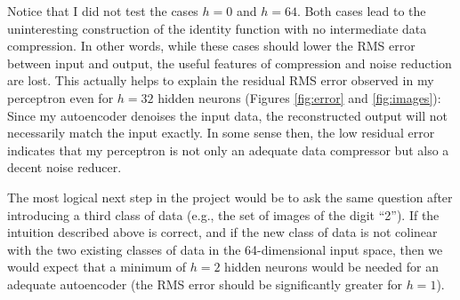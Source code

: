 \documentclass[12pt]{article}
\begin{document}
Notice that I did not test the cases $h=0$ and $h=64$. Both cases lead to the uninteresting construction of the identity function with no intermediate data compression. In other words, while these cases should lower the RMS error between input and output, the useful features of compression and noise reduction are lost. This actually helps to explain the residual RMS error observed in my perceptron even for $h=32$ hidden neurons (Figures \ref{fig:error} and \ref{fig:images}): Since my autoencoder denoises the input data, the reconstructed output will not necessarily match the input exactly. In some sense then, the low residual error indicates that my perceptron is not only an adequate data compressor but also a decent noise reducer.

The most logical next step in the project would be to ask the same question after introducing a third class of data (e.g., the set of images of the digit ``2''). If the intuition described above is correct, and if the new class of data is not colinear with the two existing classes of data in the 64-dimensional input space, then we would expect that a minimum of $h=2$ hidden neurons would be needed for an adequate autoencoder (the RMS error should be significantly greater for $h=1$).




\end{document}
